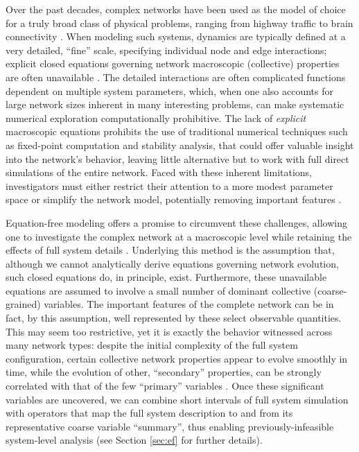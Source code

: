 Over the past decades, complex networks have been used as the model of
choice for a truly broad class of physical problems, ranging from
highway traffic \cite{joubert_large-scale_2010} to brain connectivity
\cite{hermundstad_learning_2011}.
%
When modeling such systems, dynamics are typically defined at a very
detailed, ``fine'' scale, specifying individual node and edge
interactions; explicit closed equations governing network macroscopic
(collective) properties are often unavailable
\cite{durrett_graph_2012,joubert_large-scale_2010,roche_agent-based_2011,swaminathan_modeling_1998}.
%
The detailed interactions are often complicated functions dependent on
multiple system parameters, which, when one also accounts for large
network sizes inherent in many interesting problems, can make
systematic numerical exploration computationally prohibitive.
%
The lack of \textit{explicit} macroscopic equations prohibits the use
of traditional numerical techniques such as fixed-point computation
and stability analysis, that could offer valuable insight into the
network's behavior, leaving little alternative but to work with full
direct simulations of the entire network.
%
Faced with these inherent limitations, investigators must either
restrict their attention to a more modest parameter space
\cite{hodgkin_quantitative_1952} or simplify the network model,
potentially removing important features
\cite{brown_variability_1999}. \par

Equation-free modeling offers a promise to circumvent these
challenges, allowing one to investigate the complex network at a
macroscopic level while retaining the effects of full system details
\cite{kevrekidis_equation-free:_2004,gear_equation-free_2003}.
%
Underlying this method is the assumption that, although we cannot
analytically derive equations governing network evolution, such closed
equations do, in principle, exist.
%
Furthermore, these unavailable equations are assumed to involve a
small number of dominant collective (coarse-grained) variables.
%
The important features of the complete network can be in fact, by this
assumption, well represented by these select observable quantities.
%
This may seem too restrictive, yet it is exactly the behavior
witnessed across many network types: despite the initial complexity of
the full system configuration, certain collective network properties
appear to evolve smoothly in time, while the evolution of other,
``secondary'' properties, can be strongly correlated with that of the
few ``primary'' variables
\cite{bold_equation-free_2014,rajendran_coarse_2011,siettos_equation-free_2011}.
%
Once these significant variables are uncovered, we can combine short
intervals of full system simulation with operators that map the full
system description to and from its representative coarse variable
``summary'', thus enabling previously-infeasible system-level analysis
(see Section \ref{sec:ef} for further details). \par

